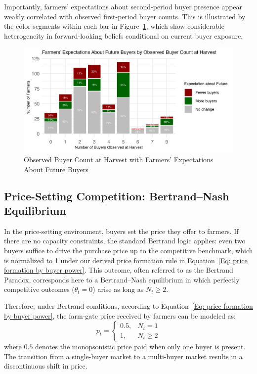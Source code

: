 Importantly, farmers' expectations about second-period buyer presence appear weakly correlated with observed first-period buyer counts. This is illustrated by the color segments within each bar in Figure~\ref{Figure: buyer count at harvest}, which show considerable heterogeneity in forward-looking beliefs conditional on current buyer exposure.

\begin{figure}[ht!]
\centering
\includegraphics[width=\textwidth]{figures/buyer_count_distribution.png}
\caption{Observed Buyer Count at Harvest with Farmers' Expectations About Future Buyers}
\label{Figure: buyer count at harvest}
\end{figure}


\subsection{Price-Setting Competition: Bertrand--Nash Equilibrium}
\noindent In the price-setting environment, buyers set the price they offer to farmers. If there are no capacity constraints, the standard Bertrand logic applies: even two buyers suffice to drive the purchase price up to the competitive benchmark, which is normalized to 1 under our derived price formation rule in Equation~\ref{Eq: price formation by buyer power}. This outcome, often referred to as the Bertrand Paradox, corresponds here to a Bertrand--Nash equilibrium in which perfectly competitive outcomes ($\theta_t=0$) arise as long as $N_t \geq 2$.

Therefore, under Bertrand conditions, according to Equation~\ref{Eq: price formation by buyer power}, the farm-gate price received by farmers can be modeled as:
\begin{equation}
p_t = 
\begin{cases}
0.5, & N_t = 1 \\
1, & N_t \geq 2
\end{cases}
\label{Eq: Bertrand Price Schedule}
\end{equation}
\noindent where $0.5$ denotes the monopsonistic price paid when only one buyer is present. The transition from a single-buyer market to a multi-buyer market results in a discontinuous shift in price.

